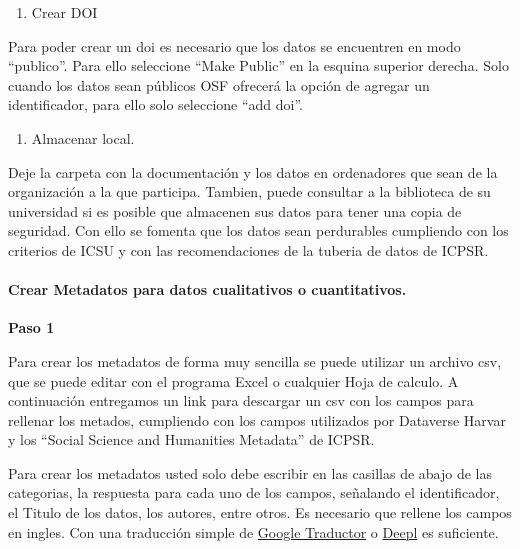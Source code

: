 \documentclass[
  14pt,
]{book}
\providecommand{\tightlist}{%
  \setlength{\itemsep}{0pt}\setlength{\parskip}{0pt}}
\begin{document}
\begin{enumerate}
\def\labelenumi{\arabic{enumi}.}
\setcounter{enumi}{5}
\tightlist
\item
  Crear DOI
\end{enumerate}

Para poder crear un doi es necesario que los datos se encuentren en modo ``publico''. Para ello seleccione ``Make Public'' en la esquina superior derecha. Solo cuando los datos sean públicos OSF ofrecerá la opción de agregar un identificador, para ello solo seleccione ``add doi''.

\begin{enumerate}
\def\labelenumi{\arabic{enumi}.}
\setcounter{enumi}{6}
\tightlist
\item
  Almacenar local.
\end{enumerate}

Deje la carpeta con la documentación y los datos en ordenadores que sean de la organización a la que participa. Tambien, puede consultar a la biblioteca de su universidad si es posible que almacenen sus datos para tener una copia de seguridad. Con ello se fomenta que los datos sean perdurables cumpliendo con los criterios de ICSU y con las recomendaciones de la tuberia de datos de ICPSR.

\hypertarget{crear-metadatos-para-datos-cualitativos-o-cuantitativos.}{%
\paragraph{Crear Metadatos para datos cualitativos o cuantitativos.}\label{crear-metadatos-para-datos-cualitativos-o-cuantitativos.}}

\textbf{Paso 1}

Para crear los metadatos de forma muy sencilla se puede utilizar un archivo csv, que se puede editar con el programa Excel o cualquier Hoja de calculo. A continuación entregamos un link para descargar un csv con los campos para rellenar los metados, cumpliendo con los campos utilizados por Dataverse Harvar y los ``Social Science and Humanities Metadata'' de ICPSR.

Para crear los metadatos usted solo debe escribir en las casillas de abajo de las categorias, la respuesta para cada uno de los campos, señalando el identificador, el Titulo de los datos, los autores, entre otros. Es necesario que rellene los campos en ingles. Con una traducción simple de \href{https://translate.google.com/}{Google Traductor} o \href{https://www.deepl.com/es/translator}{Deepl} es suficiente.
\end{document}

